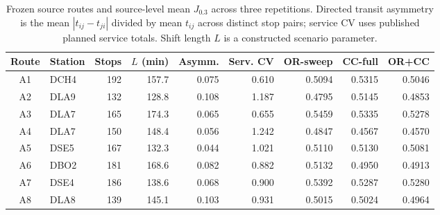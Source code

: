 \begin{table}[t]
\centering
\caption{Frozen source routes and source-level mean $J_{0.3}$ across three repetitions. Directed transit asymmetry is the mean $|t_{ij}-t_{ji}|$ divided by mean $t_{ij}$ across distinct stop pairs; service CV uses published planned service totals. Shift length $L$ is a constructed scenario parameter.}
\label{tab:external-v4-routes}
\footnotesize
\begin{tabular}{clrrrrrrr}
\toprule
Route & Station & Stops & $L$ (min) & Asymm. & Serv. CV & OR-sweep & CC-full & OR+CC \\
\midrule
A1 & DCH4 & 192 & 157.7 & 0.075 & 0.610 & 0.5094 & 0.5315 & 0.5046 \\
A2 & DLA9 & 132 & 128.8 & 0.108 & 1.187 & 0.4795 & 0.5145 & 0.4853 \\
A3 & DLA7 & 165 & 174.3 & 0.065 & 0.655 & 0.5459 & 0.5335 & 0.5278 \\
A4 & DLA7 & 150 & 148.4 & 0.056 & 1.242 & 0.4847 & 0.4567 & 0.4570 \\
A5 & DSE5 & 167 & 132.3 & 0.044 & 1.021 & 0.5110 & 0.5130 & 0.5081 \\
A6 & DBO2 & 181 & 168.6 & 0.082 & 0.882 & 0.5132 & 0.4950 & 0.4913 \\
A7 & DSE4 & 186 & 138.6 & 0.068 & 0.900 & 0.5392 & 0.5287 & 0.5280 \\
A8 & DLA8 & 139 & 145.1 & 0.103 & 0.931 & 0.5015 & 0.5024 & 0.4964 \\
\bottomrule
\end{tabular}
\end{table}
